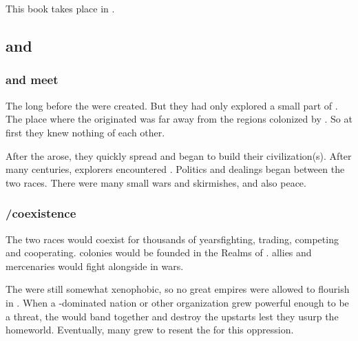 \chapter{\MerkyrahBook}
This book takes place in . 













\section{\Resphain and \Ophidians}









\subsection{\Ophidians and \resphain meet}
The \ophidians {} long before the \resphain were created.
But they had only explored a small part of \Nyx.
The place where the \resphain originated was far away from the regions colonized by \ophidians.
So at first they knew nothing of each other. 

After the \resphain arose, they quickly spread and began to build their civilization(s). 
After many centuries, \resphan explorers encountered \ophidians. 
Politics and dealings began between the two races. 
There were many small wars and skirmishes, and also peace. 









\subsection{\Ophidian/\resphan coexistence}
The two races would coexist for thousands of years\dash fighting, trading, competing and cooperating. 
\Resphan colonies would be founded in the Realms of \Azmith. 
\Resphan allies and mercenaries would fight alongside \ophidians in \ophidian wars. 

The \ophidians were still somewhat xenophobic, so no great \resphan empires were allowed to flourish in \Azmith.
When a \resphan-dominated nation or other organization grew powerful enough to be a threat, the \ophidians would band together and destroy the \resphan upstarts lest they usurp the \ophidian homeworld. 
Eventually, many \resphain grew to resent the \ophidians for this oppression. 
















